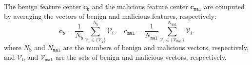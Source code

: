 The benign feature center $\mathbf{c}_\mathtt{b}$ and the malicious feature center $\mathbf{c}_\mathtt{mal}$ are computed by averaging the vectors of benign and malicious features, respectively:
\vspace{-2mm}
\begin{equation}
    \mathbf{c}_\mathtt{b} = \frac{1}{N_\mathtt{b}}\sum_{\mathcal{V}_i\in \{\mathcal{V}_\mathtt{b}\}}^{N_\mathtt{b}} \mathcal{V}_i, \quad  \mathbf{c}_\mathtt{mal} = \frac{1}{N_\mathtt{mal}}\sum_{\mathcal{V}_i\in \{\mathcal{V}_\mathtt{mal}\}}^{N_\mathtt{mal}} \mathcal{V}_i.
\end{equation}
where $N_\mathtt{b}$ and $N_\mathtt{mal}$ are the numbers of benign and malicious vectors, respectively, and $\mathcal{V}_\mathtt{b}$ and $\mathcal{V}_\mathtt{mal}$ are the sets of benign and malicious vectors, respectively.

